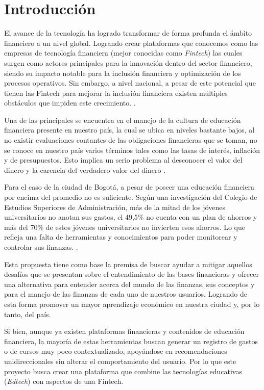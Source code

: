 \cleardoublepage 
{}
\section*{Introducción}
{}
El avance de la tecnología ha logrado transformar de forma profunda el ámbito financiero a un nivel global. Logrando crear plataformas que conocemos como las empresas de tecnología financiera (mejor conocidas como \textit{Fintech}) las cuales surgen como actores principales para la innovación dentro del sector financiero, siendo su impacto notable para la inclusión financiera y optimización de los procesos operativos. Sin embargo, a nivel nacional, a pesar de este potencial que tienen las Fintech para mejorar la inclusión financiera existen múltiples obstáculos que impiden este crecimiento. \parencite[p.~8]{RevistaCIES01}.

Una de las principales se encuentra en el manejo de la cultura de educación financiera presente en nuestro país, la cual se ubica en niveles bastante bajos, al no existir evaluaciones contantes de las obligaciones financieras que se toman, no se conoce en nuestro país varios términos tales como las tasas de interés, inflación y de presupuestos. Esto implica un serio problema al desconocer el valor del dinero y la carencia del verdadero valor del dinero \parencite[p.~13]{UniversidadLibre01}.

Para el caso de la ciudad de Bogotá, a pesar de poseer una educación financiera por encima del promedio no es suficiente. Según una investigación del Colegio de Estudios Superiores de Administración, más de la mitad de los jóvenes universitarios no anotan sus gastos, el 49,5\% no cuenta con un plan de ahorros y más del 70\% de estos jóvenes universitarios no invierten esos ahorros. Lo que refleja una falta de herramientas y conocimientos para poder monitorear y controlar sus finanzas. \parencite[p.~57]{CESA01}.

Esta propuesta tiene como base la premisa de buscar ayudar a mitigar aquellos desafíos que se presentan sobre el entendimiento de las bases financieras y ofrecer una alternativa para entender acerca del mundo de las finanzas, sus conceptos y para el manejo de las finanzas de cada uno de nuestros usuarios. Logrando de esta forma promover un mayor aprendizaje económico en nuestra ciudad y, por lo tanto, del país.

Si bien, aunque ya existen plataformas financieras y contenidos de educación financiera, la mayoría de estas herramientas buscan generar un registro de gastos o de cursos muy poco contextualizado, apoyándose en recomendaciones unidireccionales sin alterar el comportamiento del usuario. Por lo que este proyecto busca crear una plataforma que combine las tecnologías educativas (\textit{Edtech}) con aspectos de una Fintech.

